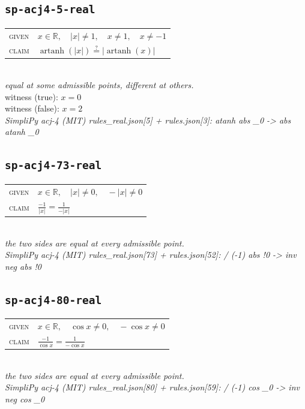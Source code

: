 \documentclass[11pt]{article}
\begin{document}
\subsection*{\texttt{sp-acj4-5-real}}
\begin{tabular}{@{}l@{\quad}l@{}}
\textsc{given} & $x \in \mathbb{R},\quad \left|x\right| \neq 1,\quad x \neq 1,\quad x \neq -1$ \\[4pt]
\textsc{claim} & $\displaystyle \operatorname{artanh}\left(\left|x\right|\right) \overset{?}{=} \left|\operatorname{artanh}\left(x\right)\right|$ \\
\end{tabular}\\[2pt]
{\small\emph{equal at some admissible points, different at others.}}\\
{\footnotesize\color{gray}witness (true): $x = 0$}\\
{\footnotesize\color{gray}witness (false): $x = 2$}\\
\emph{SimpliPy acj-4 (MIT) rules\_real.json[5] + rules.json[3]: atanh abs \_0  ->  abs atanh \_0}\\

\subsection*{\texttt{sp-acj4-73-real}}
\begin{tabular}{@{}l@{\quad}l@{}}
\textsc{given} & $x \in \mathbb{R},\quad \left|x\right| \neq 0,\quad -\left|x\right| \neq 0$ \\[4pt]
\textsc{claim} & $\displaystyle \frac{-1}{\left|x\right|} = \frac{1}{-\left|x\right|}$ \\
\end{tabular}\\[2pt]
{\small\emph{the two sides are equal at every admissible point.}}\\
\emph{SimpliPy acj-4 (MIT) rules\_real.json[73] + rules.json[52]: / (-1) abs !0  ->  inv neg abs !0}\\

\subsection*{\texttt{sp-acj4-80-real}}
\begin{tabular}{@{}l@{\quad}l@{}}
\textsc{given} & $x \in \mathbb{R},\quad \cos x \neq 0,\quad -\cos x \neq 0$ \\[4pt]
\textsc{claim} & $\displaystyle \frac{-1}{\cos x} = \frac{1}{-\cos x}$ \\
\end{tabular}\\[2pt]
{\small\emph{the two sides are equal at every admissible point.}}\\
\emph{SimpliPy acj-4 (MIT) rules\_real.json[80] + rules.json[59]: / (-1) cos \_0  ->  inv neg cos \_0}\\
\end{document}
